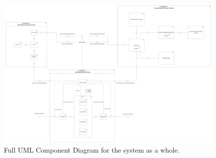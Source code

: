 \begin{figure}
    \centering
    \includegraphics[width=\linewidth]{img/Complete_Component_Diagram.pdf}
    \caption{Full UML Component Diagram for the system as a whole.}
    \label{app:component_diagram}
\end{figure}


